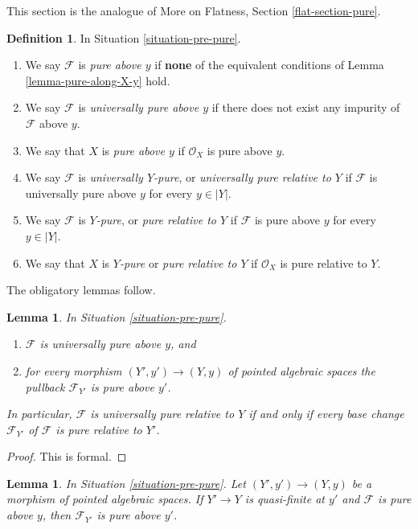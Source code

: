 \documentclass{stacks-project}
\theoremstyle{plain}
\newtheorem{lemma}[subsection]{Lemma}
\theoremstyle{definition}
\newtheorem{definition}[subsection]{Definition}
\theoremstyle{remark}
\numberwithin{equation}{subsection}
\begin{document}
\noindent
This section is the analogue of
More on Flatness, Section \ref{flat-section-pure}.

\begin{definition}
\label{definition-pure}
In Situation \ref{situation-pre-pure}.
\begin{enumerate}
\item We say $\mathcal{F}$ is {\it pure above $y$} if {\bf none} of the
equivalent conditions of Lemma \ref{lemma-pure-along-X-y} hold.
\item We say $\mathcal{F}$ is {\it universally pure above $y$}
if there does not exist any impurity of $\mathcal{F}$ above $y$.
\item We say that $X$ is {\it pure above $y$} if $\mathcal{O}_X$
is pure above $y$.
\item We say $\mathcal{F}$ is {\it universally $Y$-pure}, or
{\it universally pure relative to $Y$} if $\mathcal{F}$ is universally
pure above $y$ for every $y \in |Y|$.
\item We say $\mathcal{F}$ is {\it $Y$-pure}, or
{\it pure relative to $Y$} if $\mathcal{F}$ is pure above $y$
for every $y \in |Y|$.
\item We say that $X$ is {\it $Y$-pure} or {\it pure relative to $Y$}
if $\mathcal{O}_X$ is pure relative to $Y$.
\end{enumerate}
\end{definition}

\noindent
The obligatory lemmas follow.

\begin{lemma}
\label{lemma-base-change-universally}
In Situation \ref{situation-pre-pure}.
\begin{enumerate}
\item $\mathcal{F}$ is universally pure above $y$, and
\item for every morphism $(Y', y') \to (Y, y)$ of pointed algebraic spaces
the pullback $\mathcal{F}_{Y'}$ is pure above $y'$.
\end{enumerate}
In particular, $\mathcal{F}$ is universally pure relative to $Y$ if and
only if every base change $\mathcal{F}_{Y'}$ of $\mathcal{F}$ is
pure relative to $Y'$.
\end{lemma}

\begin{proof}
This is formal.
\end{proof}

\begin{lemma}
\label{lemma-quasi-finite-base-change}
In Situation \ref{situation-pre-pure}.
Let $(Y', y') \to (Y, y)$ be a morphism of pointed algebraic spaces.
If $Y' \to Y$ is quasi-finite at $y'$ and $\mathcal{F}$ is pure above $y$,
then $\mathcal{F}_{Y'}$ is pure above $y'$.
\end{lemma}
\end{document}
